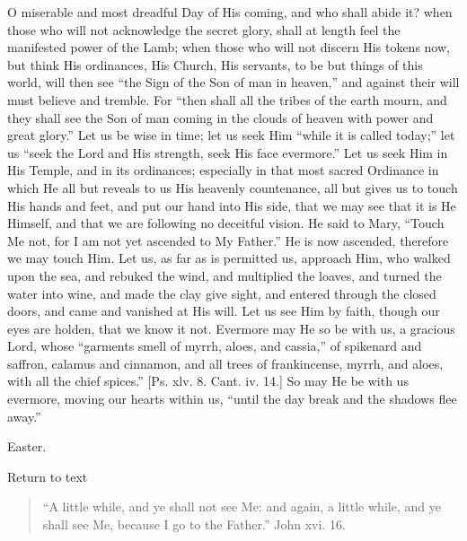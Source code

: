 O miserable and most dreadful Day of His coming, and who shall abide
it? when those who will not acknowledge the secret glory, shall at
length feel the manifested power of the Lamb; when those who will not
discern His tokens now, but think His ordinances, His Church, His
servants, to be but things of this world, will then see ``the Sign
of the Son of man in heaven,'' and against their will must believe
and tremble. For ``then shall all the tribes of the earth mourn, and
they shall see the Son of man coming in the clouds of heaven with power
and great glory.'' Let us be wise in time; let us seek Him
``while it is called today;'' let us ``seek the Lord and His
strength, seek His face evermore.'' Let us seek Him in His Temple,
and in its ordinances; especially in that most sacred Ordinance in which
He all but reveals to us His heavenly countenance, all but gives us to
touch His hands and feet, and put our hand into His side, that we may
see that it is He Himself, and that we are following no deceitful
vision. He said to Mary, ``Touch Me not, for I am not yet ascended
to My Father.'' He is now ascended, therefore we may touch Him. Let
us, as far as is permitted us, approach Him, who walked upon the sea,
and rebuked the wind, and multiplied the loaves, and turned the water
into wine, and made the clay give sight, and entered through the closed
doors, and came and vanished at His will. Let us see Him by faith,
though our eyes are holden, that we know it not. Evermore may He so be
with us, a gracious Lord, whose ``garments smell of myrrh, aloes,
and cassia,'' of spikenard and saffron, calamus and cinnamon, and
all trees of frankincense, myrrh, and aloes, with all the chief
spices.'' [Ps. xlv. 8. Cant. iv. 14.] So may He be with us evermore,
moving our hearts within us, ``until the day break and the shadows
flee away.''


Easter.

Return to text


\begin{quote}

``A little while, and ye shall not see Me: and again, a little
while, and ye shall see Me, because I go to the Father.'' John
xvi. 16.

\end{quote}

